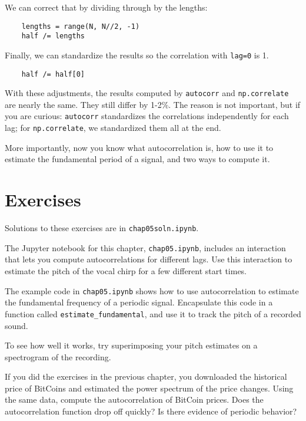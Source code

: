 We can correct that by dividing through by the lengths:

\begin{verbatim}
	lengths = range(N, N//2, -1)
	half /= lengths
\end{verbatim}

Finally, we can standardize the results so the correlation with
{\tt lag=0} is 1.

\begin{verbatim}
	half /= half[0]
\end{verbatim}

With these adjustments, the results computed by {\tt autocorr} and
{\tt np.correlate} are nearly the same.  They still differ by
1-2\%.  The reason is not important, but if you are curious: {\tt autocorr}
standardizes the correlations independently for each lag; for
{\tt np.correlate}, we standardized them all at the end.

More importantly, now you know what autocorrelation is, how to
use it to estimate the fundamental period of a signal, and two
ways to compute it.


\section{Exercises}

Solutions to these exercises are in {\tt chap05soln.ipynb}.

\begin{exercise}
	The Jupyter notebook for this chapter, {\tt chap05.ipynb}, includes
	an interaction that lets you compute autocorrelations for different
	lags.  Use this interaction to estimate the pitch of the vocal chirp
	for a few different start times.
\end{exercise}


\begin{exercise}
	The example code in \verb"chap05.ipynb" shows how to use autocorrelation
	to estimate the fundamental frequency of a periodic signal.
	Encapsulate this code in a function called \verb"estimate_fundamental",
	and use it to track the pitch of a recorded sound.
	
	To see how well it works, try superimposing your pitch estimates on a
	spectrogram of the recording.
\end{exercise}


\begin{exercise}
	If you did the exercises in the previous chapter, you downloaded
	the historical price of BitCoins and estimated the power spectrum
	of the price changes.  Using the same data, compute the autocorrelation
	of BitCoin prices.  Does the autocorrelation function drop off quickly?
	Is there evidence of periodic behavior?
\end{exercise}



